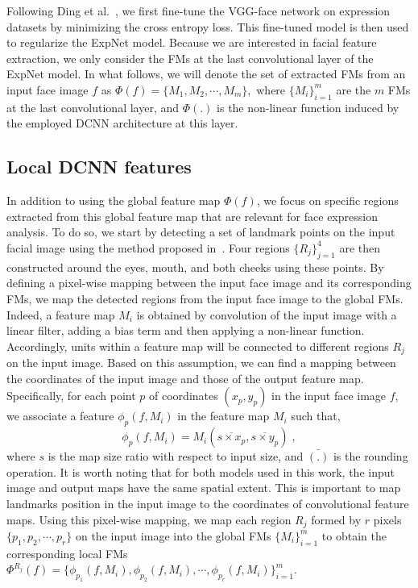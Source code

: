 \documentclass{bmvc2k}
\begin{document}
Following Ding et al.~\cite{ding2017facenet2expnet}, we first fine-tune the VGG-face network on expression datasets by minimizing the cross entropy loss. This fine-tuned model is then used to regularize the ExpNet model. Because we are interested in facial feature extraction, we only consider the FMs at the last convolutional layer of the ExpNet model. In what follows, we will denote the set of extracted FMs from an input face image $f$ as $\Phi(f)=\{M_1, M_2, \cdots, M_{m}\}$,~where $\{M_i\}_{i=1}^{m}$ are the $m$ FMs at the last convolutional layer, and $\Phi(.)$ is the non-linear function induced by the employed DCNN architecture at this layer. 

\subsection{Local DCNN features}
In addition to using the global feature map $\Phi(f)$, we focus on specific regions extracted from this global feature map that are relevant for face expression analysis. 
To do so, we start by detecting a set of landmark points on the input facial image using the method proposed in~\cite{asthana2014incremental}. Four regions $\{R_{j}\}_{j=1}^4$ are then constructed around the eyes, mouth, and both cheeks using these points. By defining a pixel-wise mapping between the input face image and its corresponding FMs, we map the detected regions from the input face image to the global FMs. Indeed, a feature map $M_{i}$ is obtained by convolution of the input image with a linear filter, adding a bias term and then applying a non-linear function. Accordingly, units within a feature map will be connected to different regions $R_{j}$ on the input image. Based on this assumption, we can find a mapping between the coordinates of the input image and those of the output feature map. 
Specifically, for each point $p$ of coordinates $(x_{p}, y_{p})$ in the input face image $f$, we associate a feature $\phi_{p}(f, M_{i})$ in the feature map $M_{i}$ such that,
%
\begin{equation}
\label{eq:Mapping}
\phi_{p}(f, M_{i}) = M{_i}(\overline{s \times x_{p}}, \overline{s\times y_{p}}) \; ,
\end{equation}
%
\noindent
where $s$ is the map size ratio with respect to input size, and $\bar{(.)}$ is the rounding operation. It is worth noting that for both models used in this work, the input image and output maps have the same spatial extent. This is important to map landmarks position in the input image to the coordinates of convolutional feature maps. Using this pixel-wise mapping, we map each region $R_j$ formed by $r$ pixels $\{p_1,p_2,\cdots,p_r\}$ on the input image into the global FMs $\{M_i\}_{i=1}^{m}$ to obtain the corresponding local FMs $\Phi^{R_j}(f)= \{\phi_{p_1}(f, M_{i}),\phi_{p_2}(f, M_{i}),\cdots,\phi_{p_r}(f, M_{i})\}_{i=1}^{m}$. 
\end{document}
